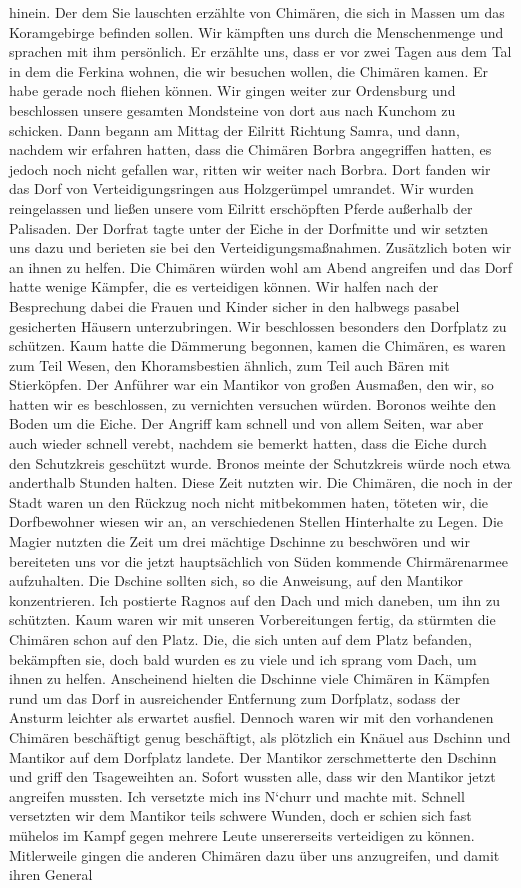 hinein. Der dem Sie lauschten erzählte von Chimären, die sich in Massen um das Koramgebirge befinden sollen. Wir kämpften uns durch die Menschenmenge und sprachen mit ihm persönlich. Er erzählte uns, dass er vor zwei Tagen aus dem Tal in dem die Ferkina wohnen, die wir besuchen wollen, die Chimären kamen. Er habe gerade noch fliehen können. Wir gingen weiter zur Ordensburg und beschlossen unsere gesamten Mondsteine von dort aus nach Kunchom zu schicken. Dann begann am Mittag der Eilritt Richtung Samra, und dann, nachdem wir erfahren hatten, dass die Chimären Borbra angegriffen hatten, es jedoch noch nicht gefallen war, ritten wir weiter nach Borbra. Dort fanden wir das Dorf von Verteidigungsringen aus Holzgerümpel umrandet. Wir wurden reingelassen und ließen unsere vom Eilritt erschöpften Pferde außerhalb der Palisaden. Der Dorfrat tagte unter der Eiche in der Dorfmitte und wir setzten uns dazu und berieten sie bei den Verteidigungsmaßnahmen. Zusätzlich boten wir an ihnen zu helfen. Die Chimären würden wohl am Abend angreifen und das Dorf hatte wenige Kämpfer, die es verteidigen können. Wir halfen nach der Besprechung dabei die Frauen und Kinder sicher in den halbwegs pasabel gesicherten Häusern unterzubringen. Wir beschlossen besonders den Dorfplatz zu schützen. Kaum hatte die Dämmerung begonnen, kamen die Chimären, es waren zum Teil Wesen, den Khoramsbestien ähnlich, zum Teil auch Bären mit Stierköpfen. Der Anführer war ein Mantikor von großen Ausmaßen, den wir, so hatten wir es beschlossen, zu vernichten versuchen würden. Boronos weihte den Boden um die Eiche. Der Angriff kam schnell und von allem Seiten, war aber auch wieder schnell verebt, nachdem sie bemerkt hatten, dass die Eiche durch den Schutzkreis geschützt wurde. Bronos meinte der Schutzkreis würde noch etwa anderthalb Stunden halten. Diese Zeit nutzten wir. Die Chimären, die noch in der Stadt waren un den Rückzug noch nicht mitbekommen haten, töteten wir, die Dorfbewohner wiesen wir an, an verschiedenen Stellen Hinterhalte zu Legen. Die Magier nutzten die Zeit um drei mächtige Dschinne zu beschwören und wir bereiteten uns vor die jetzt hauptsächlich von Süden kommende Chirmärenarmee aufzuhalten. Die Dschine sollten sich, so die Anweisung, auf den Mantikor konzentrieren. Ich postierte Ragnos auf den Dach und mich daneben, um ihn zu schützten. Kaum waren wir mit unseren Vorbereitungen fertig, da stürmten die Chimären schon auf den Platz. Die, die sich unten auf dem Platz befanden, bekämpften sie, doch bald wurden es zu viele und ich sprang vom Dach, um ihnen zu helfen. Anscheinend hielten die Dschinne viele Chimären in Kämpfen rund um das Dorf in ausreichender Entfernung zum Dorfplatz, sodass der Ansturm leichter als erwartet ausfiel. Dennoch waren wir mit den vorhandenen Chimären beschäftigt genug beschäftigt, als plötzlich ein Knäuel aus Dschinn und Mantikor auf dem Dorfplatz landete. Der Mantikor zerschmetterte den Dschinn und griff den Tsageweihten an. Sofort wussten alle, dass wir den Mantikor jetzt angreifen mussten. Ich versetzte mich ins N`churr und machte mit. Schnell versetzten wir dem Mantikor teils schwere Wunden, doch er schien sich fast mühelos im Kampf gegen mehrere Leute unsererseits verteidigen zu können. Mitlerweile gingen die anderen Chimären dazu über uns anzugreifen, und damit ihren General 